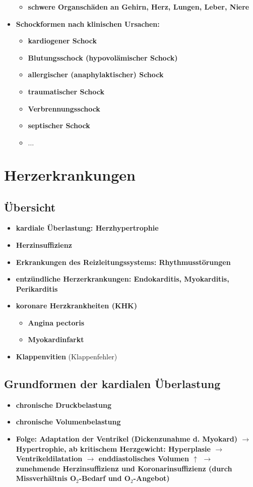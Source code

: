 \begin{itemize}
			\begin{itemize}
				\item \textbf{schwere Organschäden an Gehirn, Herz, Lungen, Leber, Niere}
			\end{itemize}
		\item \textbf{Schockformen nach klinischen Ursachen:}
			\begin{itemize}
				\item \textbf{kardiogener Schock}
				\item \textbf{Blutungsschock (hypovolämischer Schock)}
				\item \textbf{allergischer (anaphylaktischer) Schock}
				\item \textbf{traumatischer Schock}
				\item \textbf{Verbrennungsschock}
				\item \textbf{septischer Schock}
				\item \textbf{$\dots$}
			\end{itemize}
	\end{itemize}
		
\section{Herzerkrankungen}
\subsection{Übersicht}
	\begin{itemize}
		\item \textbf{kardiale Überlastung: Herzhypertrophie}
		\item \textbf{Herzinsuffizienz}
		\item \textbf{Erkrankungen des Reizleitungssystems: Rhythmusstörungen}
		\item \textbf{entzündliche Herzerkrankungen: Endokarditis, Myokarditis, Perikarditis}
		\item \textbf{koronare Herzkrankheiten (KHK)}
			\begin{itemize}
				\item \textbf{Angina pectoris}
				\item \textbf{Myokardinfarkt}
			\end{itemize}
		\item \textbf{Klappenvitien} (Klappenfehler)
	\end{itemize}
\subsection{Grundformen der kardialen Überlastung}
	\begin{itemize}
		\item \textbf{chronische Druckbelastung}
		\item \textbf{chronische Volumenbelastung}
		\item \textbf{Folge: Adaptation der Ventrikel (Dickenzunahme d. Myokard)  $\rightarrow$  Hypertrophie, ab kritischem Herzgewicht: Hyperplasie  $\rightarrow$ Ventrikeldilatation  $\rightarrow$  enddiastolisches Volumen $\uparrow$ $\rightarrow$  zunehmende Herzinsuffizienz und Koronarinsuffizienz (durch Missverhältnis O$_2$-Bedarf und  O$_2$-Angebot) }
	\end{itemize}
